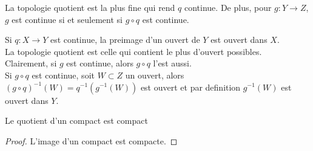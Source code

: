 \message{ !name(lec1.tex)}\documentclass[../main.tex]{subfiles}
\begin{document}
\begin{thm}
La topologie quotient est la plus fine qui rend $q$ continue. De plus, pour $g: Y \to Z$, $g$ est continue si et seulement si $g\circ q$ est continue.
\end{thm}
\begin{propo}
Si $q:X\to Y$ est continue, la preimage d'un ouvert de $Y$ est ouvert dans $X$.\\
La topologie quotient est celle qui contient le plus d'ouvert possibles.\\
Clairement, si $g$ est continue, alors $g\circ q$ l'est aussi.\\
Si $g\circ q$ est continue, soit $W \subset Z$ un ouvert, alors $( g\circ q )^{-1}( W) = q^{-1}( g^{-1}( W) ) $ est ouvert et par definition $g^{-1}( W) $ est ouvert dans $Y$.
\end{propo}
\begin{propo}
Le quotient d'un compact est compact
\end{propo}
\begin{proof}
L'image d'un compact est compacte.
\end{proof}
\end{document}
